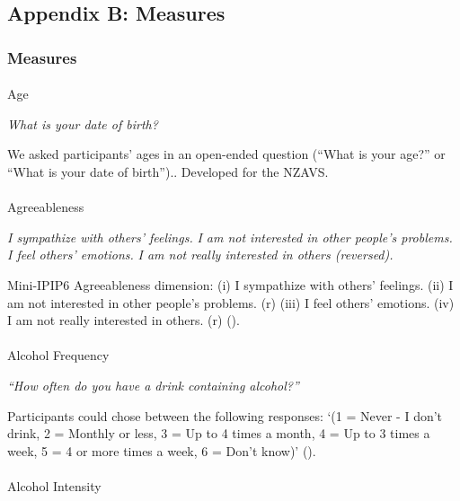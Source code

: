 \documentclass[
  single column]{article}
\makeatletter
\let\oldparagraph\paragraph
\renewcommand{\paragraph}{
    \@ifstar
      \xxxParagraphStar
      \xxxParagraphNoStar
  }
\newcommand{\xxxParagraphStar}[1]{\oldparagraph*{#1}\mbox{}}
\newcommand{\xxxParagraphNoStar}[1]{\oldparagraph{#1}\mbox{}}
\makeatother
\begin{document}
\newpage{}

\subsection{Appendix B: Measures}\label{appendix-measures-b}

\subsubsection{Measures}\label{measures-1}

\paragraph{Age}\label{age}

\emph{What is your date of birth?}

We asked participants' ages in an open-ended question (``What is your
age?'' or ``What is your date of birth'').. Developed for the NZAVS.

\paragraph{Agreeableness}\label{agreeableness}

\emph{I sympathize with others' feelings.} \emph{I am not interested in
other people's problems.} \emph{I feel others' emotions.} \emph{I am not
really interested in others (reversed).}

Mini-IPIP6 Agreeableness dimension: (i) I sympathize with others'
feelings. (ii) I am not interested in other people's problems. (r) (iii)
I feel others' emotions. (iv) I am not really interested in others. (r)
().

\paragraph{Alcohol Frequency}\label{alcohol-frequency}

\emph{``How often do you have a drink containing alcohol?''}

Participants could chose between the following responses: `(1 = Never -
I don't drink, 2 = Monthly or less, 3 = Up to 4 times a month, 4 = Up to
3 times a week, 5 = 4 or more times a week, 6 = Don't know)'
().

\paragraph{Alcohol Intensity}\label{alcohol-intensity}
\end{document}
